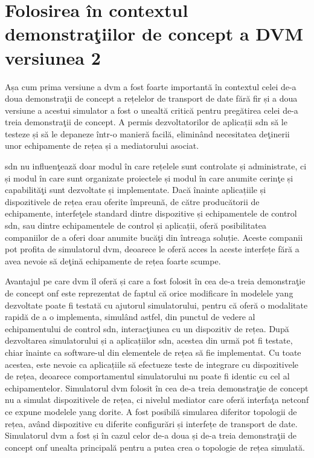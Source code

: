 \section{Folosirea în contextul demonstraţiilor de concept a DVM versiunea 2}

Așa cum prima versiune a \gls{dvm} a fost foarte importantă în contextul celei de-a doua demonstraţii de concept a rețelelor de transport de date fără fir și a doua versiune a acestui simulator a fost o unealtă critică pentru pregătirea celei de-a treia demonstraţii de concept. A permis dezvoltatorilor de aplicații \gls{sdn} să le testeze și să le depaneze într-o manieră facilă, eliminând necesitatea deţinerii unor echipamente de rețea și a mediatorului asociat.

\gls{sdn} nu influenţează doar modul în care rețelele sunt controlate și administrate, ci și modul în care sunt organizate proiectele și modul în care anumite cerinţe și capabilităţi sunt dezvoltate și implementate. Dacă înainte aplicațiile și dispozitivele de rețea erau oferite împreună, de către producătorii de echipamente, interfeţele standard dintre dispozitive și echipamentele de control \gls{sdn}, sau dintre echipamentele de control și aplicații, oferă posibilitatea companiilor de a oferi doar anumite bucăţi din întreaga soluție. Aceste companii pot profita de simulatorul \gls{dvm}, deoarece le oferă acces la aceste interfețe fără a avea nevoie să deţină echipamente de rețea foarte scumpe.

Avantajul pe care \gls{dvm} îl oferă și care a fost folosit în cea de-a treia demonstraţie de concept \gls{onf} este reprezentat de faptul că orice modificare în modelele \gls{yang} dezvoltate poate fi testată cu ajutorul simulatorului, pentru că oferă o modalitate rapidă de a o implementa, simulând astfel, din punctul de vedere al echipamentului de control \gls{sdn}, interacţiunea cu un dispozitiv de rețea. După dezvoltarea simulatorului și a aplicațiilor \gls{sdn}, acestea din urmă pot fi testate, chiar înainte ca software-ul din elementele de rețea să fie implementat. Cu toate acestea, este nevoie ca aplicațiile să efectueze teste de integrare cu dispozitivele de rețea, deoarece comportamentul simulatorului nu poate fi identic cu cel al echipamentelor. Simulatorul \gls{dvm} folosit în cea de-a treia demonstraţie de concept nu a simulat dispozitivele de rețea, ci nivelul mediator care oferă interfaţa \gls{netconf} ce expune modelele \gls{yang} dorite. A fost posibilă simularea diferitor topologii de rețea, având dispozitive cu diferite configurări și interfețe de transport de date. Simulatorul \gls{dvm} a fost și în cazul celor de-a doua și de-a treia demonstraţii de concept \gls{onf} unealta principală pentru a putea crea o topologie de rețea simulată. 

